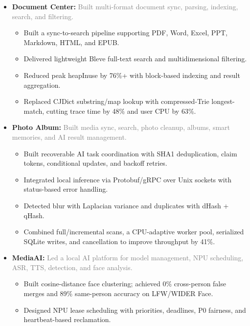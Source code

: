 \documentclass{styles/resume}
\begin{document}
\begin{itemize}

    \item \textbf{Document Center:}
    {\small
    \noindent\textcolor{gray}{Built multi-format document sync, parsing, indexing, search, and filtering.}
    }
    \vspace{0.2ex}
    \begin{itemize}
        \item Built a sync-to-search pipeline supporting PDF, Word, Excel, PPT, Markdown, HTML, and EPUB.
        \item Delivered lightweight Bleve full-text search and multidimensional filtering.
        \item Reduced peak heapInuse by 76\%+ with block-based indexing and result aggregation.
        \item Replaced CJDict substring/map lookup with compressed-Trie longest-match, cutting trace time by 48\% and user CPU by 63\%.
    \end{itemize}
    \vspace{1ex}

    \item \textbf{Photo Album:}
    {\small
    \noindent\textcolor{gray}{Built media sync, search, photo cleanup, albums, smart memories, and AI result management.}
    }
    \vspace{0.2ex}
    \begin{itemize}
        \item Built recoverable AI task coordination with SHA1 deduplication, claim tokens, conditional updates, and backoff retries.
        \item Integrated local inference via Protobuf/gRPC over Unix sockets with status-based error handling.
        \item Detected blur with Laplacian variance and duplicates with dHash + qHash.
        \item Combined full/incremental scans, a CPU-adaptive worker pool, serialized SQLite writes, and cancellation to improve throughput by 41\%.
    \end{itemize}
    \vspace{1ex}

    \item \textbf{MediaAI:}
    {\small
    \noindent\textcolor{gray}{Led a local AI platform for model management, NPU scheduling, ASR, TTS, detection, and face analysis.}
    }
    \vspace{0.2ex}
    \begin{itemize}
        \item Built cosine-distance face clustering; achieved 0\% cross-person false merges and 89\% same-person accuracy on LFW/WIDER Face.
        \item Designed NPU lease scheduling with priorities, deadlines, P0 fairness, and heartbeat-based reclamation.
    \end{itemize}
    \vspace{1ex}


\end{itemize}
\end{document}
